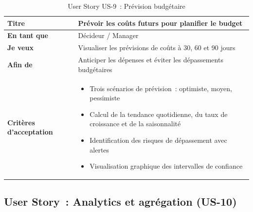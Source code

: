 \begin{table}[H]
\centering
\caption{User Story US-9~: Prévision budgétaire}
\label{tab:us9}
\begin{tabularx}{\textwidth}{|l|X|}
\hline
\textbf{Titre} & Prévoir les coûts futurs pour planifier le budget \\
\hline
\textbf{En tant que} & Décideur / Manager \\
\hline
\textbf{Je veux} & Visualiser les prévisions de coûts à 30, 60 et 90 jours \\
\hline
\textbf{Afin de} & Anticiper les dépenses et éviter les dépassements budgétaires \\
\hline
\textbf{Critères d'acceptation} & \begin{minipage}[t]{\linewidth}\vspace{2pt}
\begin{itemize}[noitemsep,topsep=0pt]
\item Trois scénarios de prévision~: optimiste, moyen, pessimiste~\cite{hyndman2018}
\item Calcul de la tendance quotidienne, du taux de croissance et de la saisonnalité
\item Identification des risques de dépassement avec alertes
\item Visualisation graphique des intervalles de confiance
\end{itemize}\vspace{2pt}
\end{minipage} \\
\hline
\end{tabularx}
\end{table}

\subsection{User Story~: Analytics et agrégation (US-10)}

